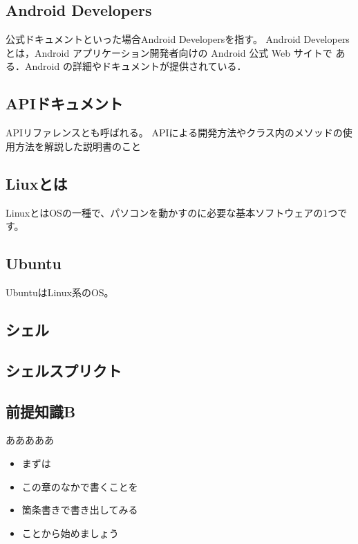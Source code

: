 \subsection{Android Developers}
公式ドキュメントといった場合Android Developersを指す。
Android Developers とは，Android アプリケーション開発者向けの Android 公式 Web サイトで
ある．Android の詳細やドキュメントが提供されている．
\subsection{APIドキュメント}
APIリファレンスとも呼ばれる。
APIによる開発方法やクラス内のメソッドの使用方法を解説した説明書のこと
\subsection{Liuxとは}
LinuxとはOSの一種で、パソコンを動かすのに必要な基本ソフトウェアの1つです。
\subsection{Ubuntu}
UbuntuはLinux系のOS。
\subsection{シェル}
\subsection{シェルスプリクト}


\subsection{前提知識B}
あああああ

\begin{itemize}
\item まずは
\item この章のなかで書くことを
\item 箇条書きで書き出してみる
\item ことから始めましょう
\end{itemize}
